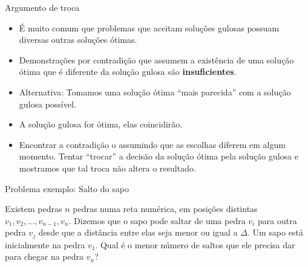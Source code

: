 \documentclass[final,hyperref={pdfpagelabels=false}]{beamer}
\begin{document}
\begin{frame}[t]
\begin{columns}[t]
\begin{column}{.465\textwidth} %


\begin{block}{Argumento de troca}

\begin{itemize}
\item É muito comum que problemas que aceitam soluções gulosas possuam diversas outras soluções
ótimas.

\item Demonstrações por contradição que assumem a existência de uma solução ótima que
é diferente da solução gulosa são \textbf{insuficientes}.

\item Alternativa: Tomamos uma solução ótima “mais parecida” com a solução gulosa possível.

\item A solução gulosa for ótima, elas coincidirão.

\item Encontrar a contradição o assumindo que as escolhas diferem em algum momento. Tentar
“trocar” a decisão da solução ótima pela solução gulosa e mostramos que tal troca não altera o
resultado.

\end{itemize}
     
\end{block}


\begin{block}{Problema exemplo: Salto do sapo}

Existem pedras $n$ pedras numa reta numérica, em posições distintas $v_1, v_2, ..., v_{n - 1}, v_n$. Dizemos que o sapo pode saltar de uma pedra $v_i$ para outra pedra $v_j$ desde que a distância entre elas seja menor ou igual a $\Delta$. Um sapo está inicialmente na pedra $v_1$. Qual é o menor número de saltos que ele precisa dar para chegar na pedra $v_n$? 


\end{block}
\end{column}
\end{columns}
\end{frame}
\end{document}
